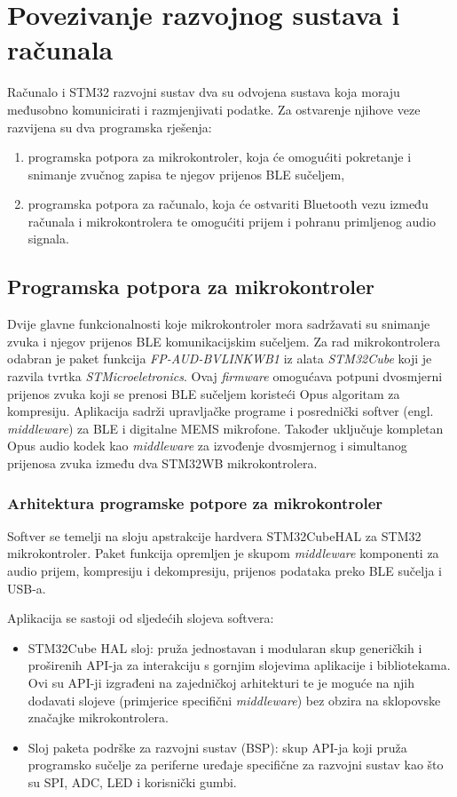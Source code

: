 \chapter{Povezivanje razvojnog sustava i računala}

Računalo i STM32 razvojni sustav dva su odvojena sustava koja moraju međusobno komunicirati i razmjenjivati podatke. Za ostvarenje njihove veze razvijena su dva programska rješenja:
\begin{enumerate}
	\item programska potpora za mikrokontroler, koja će omogućiti pokretanje i snimanje zvučnog zapisa te njegov prijenos BLE sučeljem,
	\item programska potpora za računalo, koja će ostvariti Bluetooth vezu između računala i mikrokontrolera te omogućiti prijem i pohranu primljenog audio signala.
\end{enumerate} 

\section{Programska potpora za mikrokontroler}

Dvije glavne funkcionalnosti koje mikrokontroler mora sadržavati su snimanje zvuka i njegov prijenos BLE komunikacijskim sučeljem. Za rad mikrokontrolera odabran je paket funkcija \textit{FP-AUD-BVLINKWB1} iz alata \textit{STM32Cube} koji je razvila tvrtka \textit{STMicroeletronics}. Ovaj \textit{firmware} omogućava potpuni dvosmjerni prijenos zvuka koji se prenosi BLE sučeljem koristeći Opus algoritam za kompresiju. Aplikacija sadrži upravljačke programe i posrednički softver (engl. \textit{middleware}) za BLE i digitalne MEMS mikrofone. Također uključuje kompletan Opus audio kodek kao \textit{middleware} za izvođenje dvosmjernog i simultanog prijenosa zvuka između dva STM32WB mikrokontrolera. 

\subsection{Arhitektura programske potpore za mikrokontroler}

Softver se temelji na sloju apstrakcije hardvera STM32CubeHAL za STM32 mikrokontroler. Paket funkcija opremljen je skupom \textit{middleware} komponenti za audio prijem, kompresiju i
dekompresiju, prijenos podataka preko BLE sučelja i USB-a.

Aplikacija se sastoji od sljedećih slojeva softvera:
\begin{itemize}
	\item STM32Cube HAL sloj: pruža jednostavan i modularan skup generičkih i proširenih API-ja za interakciju s gornjim slojevima aplikacije i bibliotekama. Ovi su API-ji izgrađeni na zajedničkoj arhitekturi te je moguće na njih dodavati slojeve (primjerice specifični \textit{middleware}) bez obzira na sklopovske značajke mikrokontrolera.
	\item Sloj paketa podrške za razvojni sustav (BSP): skup API-ja koji pruža programsko sučelje za periferne uređaje specifične za razvojni sustav kao što su SPI, ADC, LED i korisnički gumbi.
\end{itemize}

